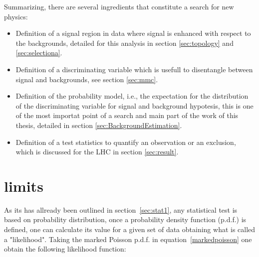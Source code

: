 
Summarizing, there are several ingredients that constitute a search for new physics:
\begin{itemize}
	\item Definition of a signal region in data where signal is enhanced with respect to the backgrounds, detailed for this analysis in section \ref{sec:topology} 
	and \ref{sec:selectiona}.
	\item Definition of a discriminating variable which is usefull to disentangle between signal and backgrounds, see section \ref{sec:mmc}.
	\item Definition of the probability model, i.e., the expectation for the distribution of the discriminating variable
		 for signal and background hypotesis, this is one of the most importat
		point of a search and main part of the work of this thesis, detailed in section \ref{sec:BackgroundEstimation}.
	\item Definition of a test statistics to quantify an observation or an exclusion, which is discussed for the LHC in section \ref{sec:result}.
\end{itemize}

\section{limits}

As its has allready been outlined in section~\ref{sec:stat1}, any statistical test is based on probability
distribution, once a probability density function (p.d.f.) is defined, one can calculate its value for a given 
set of data obtaining what is called a "likelihood".  Taking the marked Poisson
p.d.f. in equation~\eqref{markedpoisson}  one obtain the following likelihood function:
